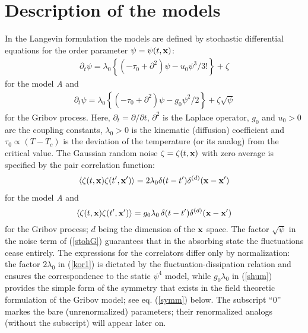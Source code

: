 \documentclass[12pt]{iopart}
\begin{document}
\section{Description of the models} \label{sec:Models}

In the Langevin formulation the models are defined by stochastic differential
equations for the order parameter $\psi = \psi(t,{\bf x})$:
\begin{eqnarray}
\partial_{t} \psi = \lambda_{0} \left\{ (-\tau_{0} +
\partial^{2}) \psi - u_{0} \psi^{3}/3! \right\} + \zeta
\label{stohA}
\end{eqnarray}
for the model {\it A} and
\begin{eqnarray}
\partial_{t} \psi = \lambda_{0} \left\{ (-\tau_{0} +
\partial^{2}) \psi - g_{0} \psi^{2}/2 \right\} + \zeta \sqrt{\psi}
\label{stohG}
\end{eqnarray}
for the Gribov process. Here, $\partial_{t}= \partial/ \partial t$,
$\partial^{2}$ is the Laplace operator, $g_{0}$ and $u_{0}>0$ are
the coupling constants, $\lambda_{0}>0$ is the kinematic (diffusion)
coefficient and $\tau_{0} \propto (T-T_{c})$ is the deviation of the
temperature (or its analog) from the critical value. The Gaussian random
noise $\zeta=\zeta(t,{\bf x})$ with zero average is specified by the pair
correlation function:
\begin{eqnarray}
\langle \zeta (t,{\bf x})\zeta (t',{\bf x'}) \rangle =
2 \lambda_{0}  \delta(t-t')\delta^{(d)}({\bf x}-{\bf x}')
\label{kor1}
\end{eqnarray}
for the model {\it A} and
\begin{equation}
\langle \zeta (t,{\bf x})\zeta (t',{\bf x'}) \rangle = g_{0}\lambda_{0}\,
\delta(t-t')\delta^{(d)}({\bf x}-{\bf x}')
\label{shum}
\end{equation}
for the Gribov process; $d$ being the dimension of the ${\bf x}$ space.
The factor $\sqrt\psi$ in the noise term of (\ref{stohG}) guarantees that
in the absorbing state the fluctuations cease entirely. The expressions
for the correlators differ only by normalization: the factor $2\lambda_{0}$
in (\ref{kor1}) is dictated by the fluctuation-dissipation relation and
ensures the correspondence to the static $\psi^{4}$ model, while
$g_{0}\lambda_{0}$ in (\ref{shum}) provides the simple form of the symmetry
that exists in the field theoretic formulation of the Gribov model;
see eq. (\ref{symm}) below. The subscript ``0'' markes the bare
(unrenormalized) parameters; their renormalized analogs (without the
subscript) will appear later on.
\end{document}
